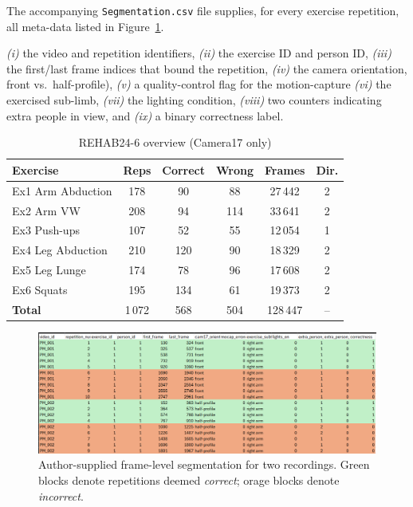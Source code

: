 \documentclass{article}
\begin{document}
The accompanying \texttt{Segmentation.csv} file supplies, for every
exercise repetition, all meta-data listed in
Figure~\ref{fig:dataset_example_original}.

\emph{(i)} the video and repetition identifiers,
\emph{(ii)} the exercise ID and person ID,
\emph{(iii)} the first/last frame indices that bound the repetition,
\emph{(iv)} the camera orientation, front vs.\ half-profile),
\emph{(v)} a quality-control flag for the motion-capture
\emph{(vi)} the exercised sub-limb,
\emph{(vii)} the lighting condition,
\emph{(viii)} two counters indicating extra people in view, and
\emph{(ix)} a binary correctness label.

\begin{table}[H]
  \caption{REHAB24-6 overview (Camera17 only)}
  \label{tab:data_overview}
  \centering
  \small
  \begin{tabular}{@{}lccccc@{}}
    \toprule
    Exercise & Reps & Correct & Wrong & Frames & Dir. \\ 
    \midrule
    Ex1 Arm Abduction  & 178 &  90 &  88 & 27\,442 & 2 \\ 
    Ex2 Arm VW         & 208 &  94 & 114 & 33\,641 & 2 \\ 
    Ex3 Push-ups       & 107 &  52 &  55 & 12\,054 & 1 \\ 
    Ex4 Leg Abduction  & 210 & 120 &  90 & 18\,329 & 2 \\ 
    Ex5 Leg Lunge      & 174 &  78 &  96 & 17\,608 & 2 \\ 
    Ex6 Squats         & 195 & 134 &  61 & 19\,373 & 2 \\ 
    \midrule
    \textbf{Total}     & 1\,072 & 568 & 504 & 128\,447 & -- \\ 
    \bottomrule
  \end{tabular}
\end{table}

\begin{figure}[H]
  \centering
  \includegraphics[width=.9\linewidth]{figs/dataset_example_original.png}
  \caption{Author-supplied frame-level segmentation for two recordings.
           Green blocks denote repetitions deemed \emph{correct}; orage
           blocks denote \emph{incorrect}.}
  \label{fig:dataset_example_original}
\end{figure}
\end{document}
